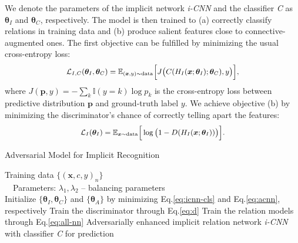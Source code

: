 \documentclass[11pt,a4paper]{article}
\newcommand{\E}{\mathbb{E}}
\begin{document}
We denote the parameters of the implicit network {\it i-CNN} and the classifier {\it C} as $\bm{\theta}_I$ and $\bm{\theta}_{C}$, respectively. The model is then trained to (a) correctly classify relations in training data and (b) produce salient features close to connective-augmented ones. The first objective can be fulfilled by minimizing the usual cross-entropy loss:
%
\begin{equation}\label{eq:icnn-cls}
\small
\begin{split}
\mathcal{L}_{I,C}(\bm{\theta}_I, \bm{\theta}_C) = \E_{(\bm{x},y)\sim \text{data}} \Big[ J\big(C(H_{I}(\bm{x}; \bm{\theta}_I); \bm{\theta}_C), y\big) \Big],
\end{split}
\end{equation}
where $J(\bm{p}, y)=-\sum_{k}\mathbb{I}(y=k)\log p_k$ is the cross-entropy loss between predictive distribution $\bm{p}$ and ground-truth label $y$. We achieve objective (b) by minimizing the discriminator's chance of correctly telling apart the features:
%
\begin{equation}\label{eq:icnn-gan}
\small
\begin{split}
\mathcal{L}_{I}(\bm{\theta}_I) = \E_{\bm{x}\sim \text{data}} \Big[ \log \big(1 - D(H_I(\bm{x}; \bm{\theta}_I)) \big) \Big].
\end{split}
\end{equation}

\begin{algorithm}[t]
\centering
\caption{\small Adversarial Model for Implicit Recognition}
\label{alg:opt}
\begin{algorithmic}[1]
\REQUIRE Training data $\{(\bm{x}, c, y)_n\}$\\
\quad\ \  Parameters: $\lambda_1, \lambda_2$  -- balancing parameters \\
\STATE Initialize $\{\bm{\theta}_I, \bm{\theta}_C\}$ and $\{\bm{\theta}_A\}$ by minimizing Eq.\eqref{eq:icnn-cls} and Eq.\eqref{eq:acnn}, respectively
\REPEAT
    \STATE Train the discriminator through Eq.\eqref{eq:d}
    \STATE Train the relation models through Eq.\eqref{eq:all-nn}
\ENSURE Adversarially enhanced implicit relation network {\it i-CNN} with classifier {\it C} for prediction
\end{algorithmic}
\end{algorithm}
\end{document}
